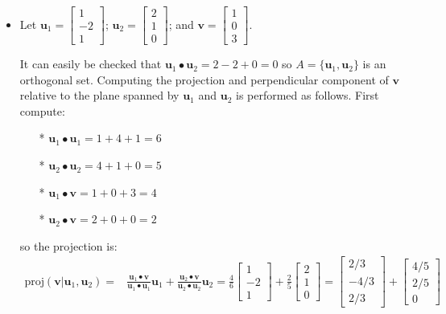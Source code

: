\documentclass{article}
\begin{document}
\begin{itemize}
\item Let \(\mathbf{u}_1 = \begin{bmatrix} 1 \\ -2 \\ 1 \end{bmatrix}\); \(\mathbf{u}_2 = \begin{bmatrix} 2 \\ 1 \\ 0 \end{bmatrix}\); and \(\mathbf{v} = \begin{bmatrix} 1 \\ 0 \\ 3 \end{bmatrix}\).

It can easily be checked that \(\mathbf{u}_1 \bullet \mathbf{u}_2 = 2 - 2 + 0 = 0\) so \(A = \{\mathbf{u}_1, \mathbf{u}_2\}\) is an orthogonal set. Computing the projection and perpendicular component of \(\mathbf{v}\) relative to the plane spanned by \(\mathbf{u}_1\) and \(\mathbf{u}_2\) is performed as follows. First compute:
\begin{itemize}
\item[*] \(\mathbf{u}_1 \bullet \mathbf{u}_1 = 1 + 4 + 1 = 6\)
\item[*] \(\mathbf{u}_2 \bullet \mathbf{u}_2 = 4 + 1 + 0 = 5\)
\item[*] \(\mathbf{u}_1 \bullet \mathbf{v} = 1 + 0 + 3 = 4\)
\item[*] \(\mathbf{u}_2 \bullet \mathbf{v} = 2 + 0 + 0 = 2\)
\end{itemize} 
so the projection is:
\begin{align*}
\text{proj}(\mathbf{v} | \mathbf{u}_1, \mathbf{u}_2) = & \frac{\mathbf{u}_1 \bullet \mathbf{v}}{\mathbf{u}_1 \bullet \mathbf{u}_1}\mathbf{u}_1 + \frac{\mathbf{u}_2 \bullet \mathbf{v}}{\mathbf{u}_2 \bullet \mathbf{u}_2}\mathbf{u}_2  
= \frac{4}{6}\begin{bmatrix} 1 \\ -2 \\ 1 \end{bmatrix} + \frac{2}{5}\begin{bmatrix} 2 \\ 1 \\ 0 \end{bmatrix} 
= \begin{bmatrix} 2/3 \\ -4/3 \\ 2/3 \end{bmatrix} + \begin{bmatrix} 4/5 \\ 2/5 \\ 0 \end{bmatrix} 

\end{align*}
\end{itemize}
\end{document}
